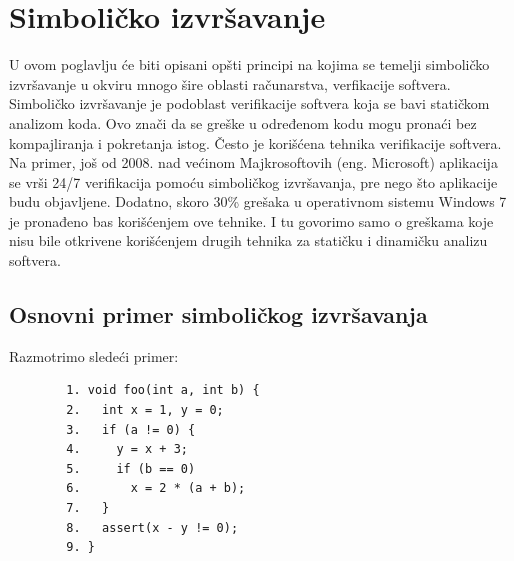 \documentclass[12pt]{article}
\begin{document}
\thispagestyle{empty}

\section{Simboličko izvršavanje}
U ovom poglavlju će biti opisani opšti principi na kojima se temelji simboličko izvršavanje u okviru mnogo šire oblasti računarstva, verfikacije softvera. Simboličko izvršavanje je podoblast verifikacije softvera koja se bavi statičkom analizom koda. Ovo znači da se greške u određenom kodu mogu pronaći bez kompajliranja i pokretanja istog. Često je korišćena tehnika verifikacije softvera. Na primer, još od 2008. nad većinom Majkrosoftovih (eng. Microsoft) aplikacija se vrši 24/7 verifikacija pomoću simboličkog izvršavanja, pre nego što aplikacije budu objavljene. Dodatno, skoro 30\% grešaka u operativnom sistemu Windows 7 je pronađeno bas korišćenjem ove tehnike. I tu govorimo samo o greškama koje nisu bile otkrivene korišćenjem drugih tehnika za statičku i dinamičku analizu softvera. 

\subsection{Osnovni primer simboličkog izvršavanja}

Razmotrimo sledeći primer: 

    \begin{lstlisting}
        1. void foo(int a, int b) {
        2.   int x = 1, y = 0;
        3.   if (a != 0) {
        4.     y = x + 3;
        5.     if (b == 0)
        6.       x = 2 * (a + b);
        7.   }
        8.   assert(x - y != 0);
        9. }
    \end{lstlisting}
\end{document}
